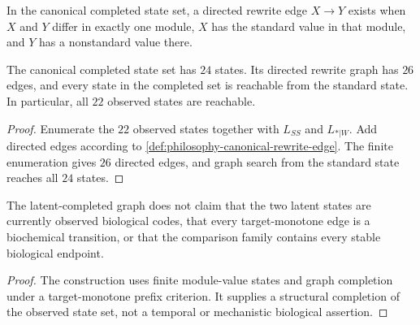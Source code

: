 \begin{definition}
\label{def:philosophy-canonical-rewrite-edge}
In the canonical completed state set, a directed rewrite edge
$X\to Y$ exists when $X$ and $Y$ differ in exactly one module, $X$ has
the standard value in that module, and $Y$ has a nonstandard value there.
\end{definition}

\begin{theorem}
\label{thm:philosophy-canonical-rewrite-reachability}
The canonical completed state set has $24$ states. Its directed rewrite
graph has $26$ edges, and every state in the completed set is reachable
from the standard state. In particular, all $22$ observed states are
reachable.
\end{theorem}
\begin{proof}
Enumerate the $22$ observed states together with $L_{SS}$ and
$L_{*|W}$. Add directed edges according to
\autoref{def:philosophy-canonical-rewrite-edge}. The finite enumeration
gives $26$ directed edges, and graph search from the standard state
reaches all $24$ states.
\end{proof}

\begin{theorem}
\label{thm:philosophy-latent-completed-grammar-boundary}
The latent-completed graph does not claim that the two latent states are
currently observed biological codes, that every target-monotone edge is
a biochemical transition, or that the comparison family contains every
stable biological endpoint.
\end{theorem}
\begin{proof}
The construction uses finite module-value states and graph completion
under a target-monotone prefix criterion. It supplies a structural
completion of the observed state set, not a temporal or mechanistic
biological assertion.
\end{proof}
